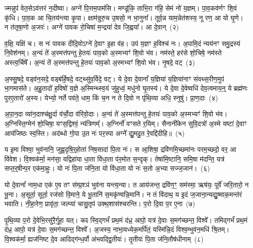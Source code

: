 ज्मन्नुप॑ वेत॒से\-ऽव॑त्तरं न॒दीष्वा। अग्ने॑ पि॒त्तम॒पाम॑सि। मण्डू॑कि॒ ताभि॒रा ग॑हि॒ सेमं नो॑ य॒ज्ञम्। पा॒व॒कव॑र्णꣳ शि॒वं कृ॑धि। पा॒व॒क आ चि॒तय॑न्त्या कृ॒पा। क्षाम॑न्रुरु॒च उ॒षसो॒ न भा॒नुना᳚। तूर्व॒न्न याम॒न्नेत॑शस्य॒ नू रण॒ आ यो घृ॒णे। न त॑तृषा॒णो अ॒जरः॑। अग्ने॑ पावक रो॒चिषा॑ म॒न्द्रया॑ देव जि॒ह्वया᳚। आ दे॒वान्~(२)

व॒क्षि॒ यक्षि॑ च। स नः॑ पावक दीदि॒वो\-ऽग्ने॑ दे॒वाꣳ इ॒हा व॑ह। उप॑ य॒ज्ञꣳ ह॒विश्च॑ नः। अ॒पामि॒दं न्यय॑नꣳ समु॒द्रस्य॑ नि॒वेश॑नम्। अ॒न्यं ते॑ अ॒स्मत्त॑पन्तु हे॒तयः॑ पाव॒को अ॒स्मभ्यꣳ॑ शि॒वो भ॑व। नम॑स्ते॒ हर॑से शो॒चिषे॒ नम॑स्ते अस्त्व॒र्चिषे᳚। अ॒न्यं ते॑ अ॒स्मत्त॑पन्तु हे॒तयः॑ पाव॒को अ॒स्मभ्यꣳ॑ शि॒वो भ॑व। नृ॒षदे॒ वट्~(३)

अ॒फ्सु॒षदे॒ वड्व॑न॒सदे॒ वड्ब॑र्\mbox{}हि॒षदे॒ वट्थ्सु॑व॒र्विदे॒ वट्। ये दे॒वा दे॒वानां᳚ य॒ज्ञिया॑ य॒ज्ञिया॑नाꣳ संवथ्स॒रीण॒मुप॑ भा॒गमास॑ते। अ॒हु॒तादो॑ ह॒विषो॑ य॒ज्ञे अ॒स्मिन्थ्स्व॒यं जु॑हुध्वं॒ मधु॑नो घृ॒तस्य॑। ये दे॒वा दे॒वेष्वधि॑ देव॒त्वमाय॒न्॒ ये ब्रह्म॑णः पुरए॒तारो॑ अ॒स्य। येभ्यो॒ नर्ते पव॑ते॒ धाम॒ किं च॒न न ते दि॒वो न पृ॑थि॒व्या अधि॒ स्नुषु॑। प्रा॒ण॒दाः~(४)

अ॒पा॒न॒दा व्या॑न॒दाश्च॑क्षु॒र्दा व॑र्चो॒दा व॑रिवो॒दाः। अ॒न्यं ते॑ अ॒स्मत्त॑पन्तु हे॒तयः॑ पाव॒को अ॒स्मभ्यꣳ॑ शि॒वो भ॑व। अ॒ग्निस्ति॒ग्मेन॑ शो॒चिषा॒ यꣳस॒द्विश्वं॒ न्य॑त्रिणम्᳚। अ॒ग्निर्नो॑ वꣳसते र॒यिम्। सैनानी॑केन सुवि॒दत्रो॑ अ॒स्मे यष्टा॑ दे॒वाꣳ आय॑जिष्ठः स्व॒स्ति। अद॑ब्धो गो॒पा उ॒त नः॑ पर॒स्पा अग्ने᳚ द्यु॒मदु॒त रे॒वद्दि॑दीहि॥~(५)

{\anuvakamend[{उप॑ दे॒वान् वट्प्रा॑ण॒दाश्चतु॑श्चत्वारिꣳशच्च}]}%

य इ॒मा विश्वा॒ भुव॑नानि॒ जुह्व॒दृषि॒र्॒\mbox{}होता॑ निष॒सादा॑ पि॒ता नः॑। स आ॒शिषा॒ द्रवि॑णमि॒च्छमा॑नः परम॒च्छदो॒ वर॒ आ वि॑वेश। वि॒श्वक॑र्मा॒ मन॑सा॒ यद्विहा॑या धा॒ता वि॑धा॒ता प॑र॒मोत स॒न्दृक्। तेषा॑मि॒ष्टानि॒ समि॒षा म॑दन्ति॒ यत्र॑ सप्त॒र्॒\mbox{}षीन्प॒र एक॑मा॒हुः। यो नः॑ पि॒ता ज॑नि॒ता यो वि॑धा॒ता यो नः॑ स॒तो अ॒भ्या सज्ज॒जान॑।~(६)

यो दे॒वानां᳚ नाम॒धा एक॑ ए॒व तꣳ स॑म्प्र॒श्ञं भुव॑ना यन्त्य॒न्या। त आय॑जन्त॒ द्रवि॑ण॒ꣳ॒ सम॑स्मा॒ ऋष॑यः॒ पूर्वे॑ जरि॒तारो॒ न भू॒ना। अ॒सूर्ता॒ सूर्ता॒ रज॑सो वि॒माने॒ ये भू॒तानि॑ स॒मकृ॑ण्वन्नि॒मानि॑। न तं वि॑दाथ॒ य इ॒दं ज॒जाना॒न्यद्यु॒ष्माक॒मन्त॑रं भवाति। नी॒हा॒रेण॒ प्रावृ॑ता॒ जल्प्या॑ चासु॒तृप॑ उक्थ॒शास॑श्चरन्ति। प॒रो दि॒वा प॒र ए॒ना~(७)

पृ॒थि॒व्या प॒रो दे॒वेभि॒रसु॑रै॒र्गुहा॒ यत्। कꣴ स्वि॒द्गर्भं॑ प्रथ॒मं द॑ध्र॒ आपो॒ यत्र॑ दे॒वाः स॒मग॑च्छन्त॒ विश्वे᳚। तमिद्गर्भं॑ प्रथ॒मं द॑ध्र॒ आपो॒ यत्र॑ दे॒वाः स॒मग॑च्छन्त॒ विश्वे᳚। अ॒जस्य॒ नाभा॒वध्येक॒मर्पि॑तं॒ यस्मि॑न्नि॒दं विश्व॒म्भुव॑न॒\-मधि॑ श्रि॒तम्। वि॒श्वक॑र्मा॒ ह्यज॑निष्ट दे॒व आदिद्ग॑न्ध॒र्वो अ॑भवद्द्वि॒तीयः॑। तृ॒तीयः॑ पि॒ता ज॑नि॒तौष॑धीनाम्~(८)

